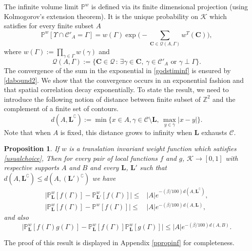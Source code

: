 \documentclass[10pt]{amsart}
\let\mathcal\mathscr
\newcommand{\sep}{\,:\,}
\numberwithin{equation}{section}
\theoremstyle{plain}
\newtheorem{proposition}[theorem]{Proposition}
\theoremstyle{definition}
\newcommand{\cc}{\complement}
\newcommand{\cQ}{{\ensuremath{\mathcal Q}} }
\newcommand{\cC}{{\ensuremath{\mathcal C}} }
\newcommand{\cK}{{\ensuremath{\mathcal K}} }
\newcommand{\bC}{{\ensuremath{\mathbf C}} }
\newcommand{\bL}{{\ensuremath{\mathbf L}} }
\newcommand{\bbP}{{\ensuremath{\mathbb P}} }
\newcommand{\bbZ}{{\ensuremath{\mathbb Z}} }
\newcommand{\gb}{\beta}
\newcommand{\gG}{\Gamma}
\begin{document}
The infinite volume limit $\bbP^w$ is defined via its finite dimensional projection (using Kolmogorov's extension theorem). It is the
unique probability on $\cK$ which satisfies for every finite subset $A$
\begin{equation}\label{godstiminf}
\bbP^w[\Upsilon \cap \cC'_{A}=\gG]=
w(\gG)\exp\biggl(-\sum_{\bC\in \cQ(A,\gG)} w^T(\bC)\biggr),
\end{equation}
where $w(\gG):=\prod_{\gamma\in \gG}w(\gamma)$ and
\begin{equation*}
\cQ(A,\gG):=\{\bC\in \cQ \sep \exists \gamma\in \bC, \ \gamma\in \cC'_A \text{ or } \gamma \perp \gG \}.
\end{equation*}
The convergence of the sum in the exponential in \eqref{godstiminf} is ensured by \eqref{dabound2}.
We show that the convergence occurs in an exponential fashion and that spatial correlation decay exponentially.
To state the result, we need to introduce the following notion of distance between finite subset of $\bbZ^2$
and the complement of a finite set of contours.
\begin{equation*}
d(A,\bL^{\cc}):= \min\{ x\in A, \gamma\in \cC\setminus \bL, \ \max_{y\in \bar \gamma} |x-y|\}.
\end{equation*}
Note that when $A$ is fixed, this distance grows to infinity when $\bL$ exhausts $\cC$.

\begin{proposition}\label{propinfi}
If $w$ is a translation invariant weight function which satisfies \eqref{usualchoice},
Then
for every pair of local functions $f$ and $g$, $\cK \to [0,1]$ with respective supports $A$ and $B$ and every $\bL$, $\bL'$ such that
$ d(A,\bL^\cc) \le d(A,(\bL')^\cc)$ we have
\begin{equation}\label{convergenz}
\begin{split}
\bigl| \bbP^w_{\bL}[f(\gG)]-\bbP^w_{\bL'}[f(\gG)]\bigr|\le &|A|e^{-(\gb/100)d(A,\bL^\cc)},\\
\bigl| \bbP^w_{\bL}[f(\gG)]-\bbP^w[f(\gG)]\bigr|\le &|A|e^{-(\gb/100)d(A,\bL)},
\end{split}
\end{equation}
and also
\begin{equation}\label{decayze}
\bigl|\bbP^w_{\bL}[f(\gG)g(\gG)]- \bbP^w_{\bL}[f(\gG)]\bbP^w_{\bL}[g(\gG)]\bigr|\le |A|e^{-(\gb/100)d(A,B)}.
\end{equation}
\end{proposition}

The proof of this result is displayed in Appendix \ref{ppropinf} for completeness.
\end{document}

